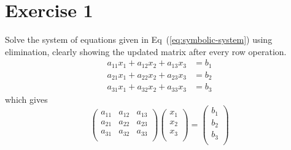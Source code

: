 \documentclass[12pt]{article}
\begin{document}
\section{Exercise 1}
Solve the system of equations given in Eq~(\ref{eq:symbolic-system}) using
elimination, clearly showing the updated matrix after every row operation. 
\begin{equation}
    \begin{aligned}
        a_{11} x_{1} + a_{12} x_{2} + a_{13} x_{3} & = b_{1}    \\ 
        a_{21} x_{1} + a_{22} x_{2} + a_{23} x_{3} & = b_{2}    \\
        a_{31} x_{1} + a_{32} x_{2} + a_{33} x_{3} & = b_{3} 
    \end{aligned}
    \label{eq:symbolic-system}
\end{equation}
which gives
\begin{equation}
    \begin{pmatrix}
        a_{11}      &   a_{12}      &   a_{13}              \\
        a_{21}      &   a_{22}      &   a_{23}              \\
        a_{31}      &   a_{32}      &   a_{33}              \\
    \end{pmatrix}
    \begin{pmatrix}
        x_{1}       \\
        x_{2}       \\
        x_{3}       \\
    \end{pmatrix}
    =
    \begin{pmatrix}
        b_{1}       \\
        b_{2}       \\
        b_{3}       \\
    \end{pmatrix}
\end{equation}
\end{document}
